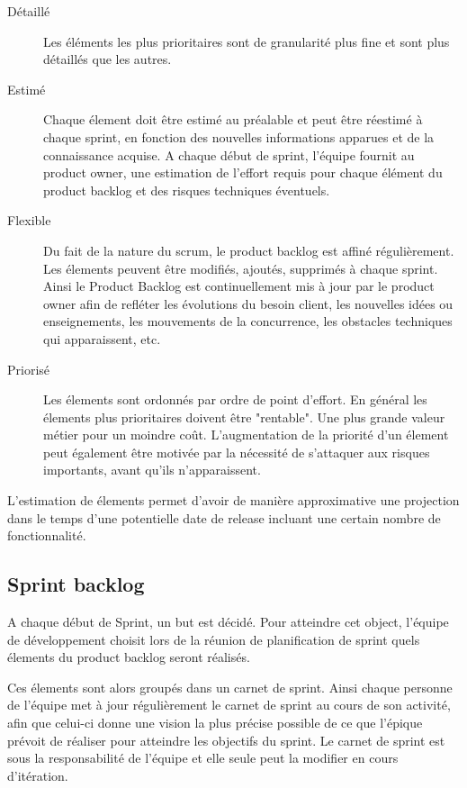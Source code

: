 \begin{description}
    \item[Détaillé]{Les éléments les plus prioritaires sont de granularité plus fine et sont plus détaillés que les autres.}
    \item[Estimé]{Chaque élement doit être estimé au préalable et peut être réestimé à chaque sprint, en fonction des nouvelles informations apparues et de la connaissance acquise. A chaque début de sprint, l'équipe fournit au product owner, une estimation de l'effort requis pour chaque élément du product backlog et des risques techniques éventuels. }
    \item[Flexible]{Du fait de la nature du scrum, le product backlog est affiné régulièrement. Les élements peuvent être modifiés, ajoutés, supprimés à chaque sprint. Ainsi le Product Backlog est continuellement mis à jour par le product owner afin de refléter les évolutions du besoin client, les nouvelles idées ou enseignements, les mouvements de la concurrence, les obstacles techniques qui apparaissent, etc.}
    \item[Priorisé]{Les élements sont ordonnés par ordre de point d'effort. En général les élements plus prioritaires doivent être "rentable". Une plus grande valeur métier pour un moindre coût. L'augmentation de la priorité d'un élement peut également être motivée par la nécessité de s'attaquer aux risques importants, avant qu'ils n'apparaissent.}
\end{description}

L'estimation de élements permet d'avoir de manière approximative une projection dans le temps d'une potentielle date de release incluant une certain nombre de fonctionnalité. 



\subsection{Sprint backlog}

A chaque début de Sprint, un but est décidé. Pour atteindre cet object, l'équipe de développement choisit lors de la réunion de planification de sprint quels élements du product backlog seront réalisés. 

Ces élements sont alors groupés dans un carnet de sprint.
Ainsi chaque personne de l'équipe met à jour régulièrement le carnet de sprint au cours de son activité, afin que celui-ci donne une vision la plus précise possible de ce que l'épique prévoit de réaliser pour atteindre les objectifs du sprint. Le carnet de sprint est sous la responsabilité de l'équipe et elle seule peut la modifier en cours d'itération. 

